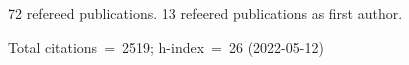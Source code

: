 72 refereed publications. 13 refeered publications as first author.

Total citations~=~2519; h-index~=~26 (2022-05-12)